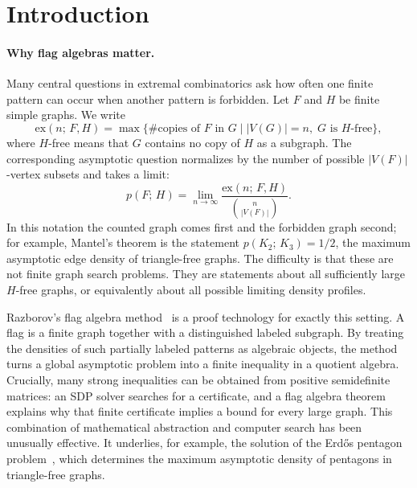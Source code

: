 \documentclass{article}
\newcommand{\tdensity}[2]{p(#1;\,#2)}
\begin{document}
\section{Introduction}
\label{sec:intro}

\paragraph{Why flag algebras matter.}
Many central questions in extremal combinatorics ask how often one finite
pattern can occur when another pattern is forbidden.  Let $F$ and $H$ be
finite simple graphs.  We write
\[
  \mathrm{ex}(n;\,F,H)
  =
  \max\bigl\{
    \#\text{copies of }F\text{ in }G
    \mid |V(G)|=n,\; G\text{ is }H\text{-free}
  \bigr\},
\]
where $H$-free means that $G$ contains no copy of $H$ as a subgraph.  The
corresponding asymptotic question normalizes by the number of possible
$|V(F)|$-vertex subsets and takes a limit:
\[
  \tdensity{F}{H}
  =
  \lim_{n\to\infty}
  \frac{\mathrm{ex}(n;\,F,H)}{\binom{n}{|V(F)|}}.
\]
In this notation the counted graph comes first and the forbidden graph second;
for example, Mantel's theorem is the statement $\tdensity{K_2}{K_3}=1/2$, the
maximum asymptotic edge density of triangle-free graphs.  The difficulty is
that these are not finite graph search problems.  They are statements about
all sufficiently large $H$-free graphs, or equivalently about all possible
limiting density profiles.

Razborov's flag algebra method~\cite{razborov2007flag} is a proof technology
for exactly this setting.  A flag is a finite graph together with a
distinguished labeled subgraph.  By treating the densities of such partially
labeled patterns as algebraic objects, the method turns a global asymptotic
problem into a finite inequality in a quotient algebra.  Crucially, many
strong inequalities can be obtained from positive semidefinite matrices: an
SDP solver searches for a certificate, and a flag algebra theorem explains
why that finite certificate implies a bound for every large graph.  This
combination of mathematical abstraction and computer search has been unusually
effective.  It underlies, for example, the solution of the Erd\H{o}s pentagon
problem~\cite{hatami2012,grzesik2012}, which determines the maximum asymptotic
density of pentagons in triangle-free graphs.
\end{document}
